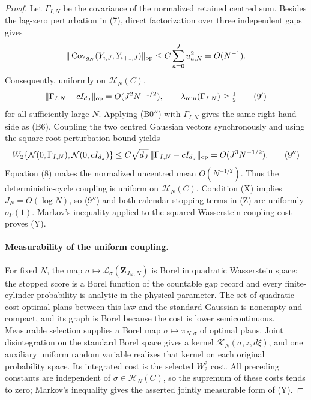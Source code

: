 \begin{proof}
Let $\Gamma_{I,N}$ be the covariance of the normalized retained centred
sum.  Besides the lag-zero perturbation in \textup{(7)}, direct factorization
over three independent gaps gives
\[
 \|\operatorname{Cov}_{g_N}(Y_{i,J},Y_{i+1,J})\|_{\rm op}
 \leq C\sum_{a=0}^Ju_{a,N}^2=O(N^{-1}).
\]
Consequently, uniformly on $\mathcal H_N(C)$,
\[
 \|\Gamma_{I,N}-cI_{d_J}\|_{\rm op}
 =O(J^2N^{-1/2}),
 \qquad \lambda_{\min}(\Gamma_{I,N})\geq\tfrac12
 \tag{9$'$}
\]
for all sufficiently large $N$.  Applying \textup{(B0$''$)} with
$\Gamma_{I,N}$ gives the same right-hand side as \textup{(B6)}.  Coupling
the two centred Gaussian vectors synchronously and using the square-root
perturbation bound yields
\[
 W_2\{\mathcal N(0,\Gamma_{I,N}),\mathcal N(0,cI_{d_J})\}
 \leq C\sqrt{d_J}\,\|\Gamma_{I,N}-cI_{d_J}\|_{\rm op}
 =O(J^3N^{-1/2}).
 \tag{9$''$}
\]
Equation \textup{(8)} makes the normalized uncentred mean $O(N^{-1/2})$.
Thus the deterministic-cycle coupling is uniform on $\mathcal H_N(C)$.
Condition \textup{(X)} implies $J_N=O(\log N)$, so
\textup{(9$''$)} and both calendar-stopping terms in \textup{(Z)} are
uniformly $o_P(1)$.  Markov's inequality applied to the squared
Wasserstein coupling cost proves \textup{(Y)}.

\paragraph{Measurability of the uniform coupling.}
For fixed $N$, the map
$\sigma\mapsto\mathcal L_\sigma(\mathbf Z_{J_N,N})$ is Borel in quadratic
Wasserstein space: the stopped score is a Borel function of the countable
gap record and every finite-cylinder probability is analytic in the physical
parameter.  The set of quadratic-cost optimal plans between this law and the
standard Gaussian is nonempty and compact, and its graph is Borel because
the cost is lower semicontinuous.  Measurable selection supplies a Borel map
$\sigma\mapsto\pi_{N,\sigma}$ of optimal plans.  Joint disintegration on the
standard Borel space gives a kernel
$\mathcal K_N(\sigma,z,d\xi)$, and one auxiliary uniform random variable
realizes that kernel on each original probability space.  Its integrated
cost is the selected $W_2^2$ cost.  All preceding constants are independent
of $\sigma\in\mathcal H_N(C)$, so the supremum of these costs tends to zero;
Markov's inequality gives the asserted jointly measurable form of
\textup{(Y)}.


\end{proof}
